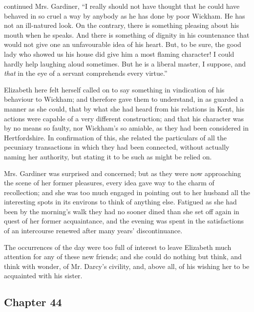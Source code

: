  continued Mrs. Gardiner, “I really should not have thought that he could have behaved in so cruel a way by anybody as he has done by poor Wickham. He has not an ill-natured look. On the contrary, there is something pleasing about his mouth when he speaks. And there is something of dignity in his countenance that would not give one an unfavourable idea of his heart. But, to be sure, the good lady who showed us his house did give him a most flaming character! I could hardly help laughing aloud sometimes. But he is a liberal master, I suppose, and {\em that} in the eye of a servant comprehends every virtue.”

Elizabeth here felt herself called on to say something in vindication of his behaviour to Wickham; and therefore gave them to understand, in as guarded a manner as she could, that by what she had heard from his relations in Kent, his actions were capable of a very different construction; and that his character was by no means so faulty, nor Wickham's so amiable, as they had been considered in Hertfordshire. In confirmation of this, she related the particulars of all the pecuniary transactions in which they had been connected, without actually naming her authority, but stating it to be such as might be relied on.

Mrs. Gardiner was surprised and concerned; but as they were now approaching the scene of her former pleasures, every idea gave way to the charm of recollection; and she was too much engaged in pointing out to her husband all the interesting spots in its environs to think of anything else. Fatigued as she had been by the morning's walk they had no sooner dined than she set off again in quest of her former acquaintance, and the evening was spent in the satisfactions of an intercourse renewed after many years' discontinuance.

The occurrences of the day were too full of interest to leave Elizabeth much attention for any of these new friends; and she could do nothing but think, and think with wonder, of Mr. Darcy's civility, and, above all, of his wishing her to be acquainted with his sister.

\subsection[chapter-44]{\useURL[url44][][][]\from[url44] Chapter 44}

